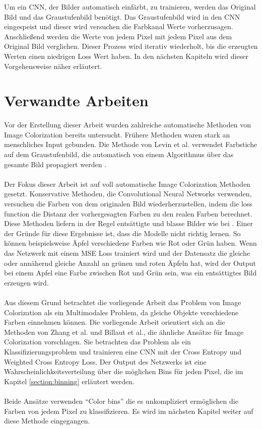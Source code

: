 Um ein CNN, der Bilder automatisch einfärbt, zu trainieren, werden das Original Bild und das Graustufenbild benötigt. Das Graustufenbild wird
in den CNN eingespeist und dieser wird versuchen die Farbkanal Werte vorherzusagen. Anschließend werden die Werte von jedem Pixel mit jedem Pixel
aus dem Original Bild verglichen. Dieser Prozess wird iterativ wiederholt, bis die erzeugten Werten einen niedrigen Loss Wert haben. In den
nächsten Kapiteln wird dieser Vorgehensweise näher erläutert.

\section{Verwandte Arbeiten}\label{subsection:verwandte-arbeiten}
Vor der Erstellung dieser Arbeit wurden zahlreiche automatische Methoden von Image Colorization bereits untersucht. Frühere Methoden waren
stark an menschliches Input
gebunden. Die Methode von Levin et al. verwendet Farbstiche auf dem Graustufenbild, die automatisch von einem Algorithmus über das gesamte 
Bild propagiert werden \cite{10.1145/1015706.1015780}.
\\
\\
Der Fokus dieser Arbeit ist auf voll automatische Image Colorization Methoden gesetzt. Konservative Methoden, die Convolutional Neural Networks 
verwenden, versuchen die Farben von dem originalen Bild wiederherzustellen, indem die \gls{loss function} die Distanz der vorhergesagten
Farben zu den realen Farben berechnet. Diese Methoden liefern in der Regel entsättigte und blasse Bilder wie bei \cite{zbulak2019image}. 
Einer der Gründe für diese Ergebnisse ist, dass die Modelle nicht richtig lernen. So können beispielsweise Äpfel verschiedene Farben 
wie Rot oder Grün haben. Wenn das Netzwerk mit einem MSE Loss trainiert wird und der Datensatz die gleiche oder annähernd gleiche Anzahl an
grünen und roten Äpfeln hat, wird der Output bei einem Apfel eine Farbe zwischen Rot und Grün sein, was ein entsättigtes Bild erzeugen wird.
\\
\\
Aus diesem Grund betrachtet die vorliegende Arbeit das Problem von Image Colorization als ein Multimodales Problem, 
da gleiche Objekte verschiedene Farben einnehmen können.
Die vorliegende Arbeit orientiert sich an die Methoden von Zhang et al. und Billaut et al., die ähnliche Ansätze für Image Colorization vorschlagen.
Sie betrachten das Problem als ein Klassifizierungsproblem und trainieren eine CNN mit der Cross Entropy und Weighted Cross Entropy Loss. 
Der Output des Netzwerks ist eine Wahrscheinlichkeitsverteilung über die möglichen Bins für jeden Pixel, die im Kapitel \ref{section:binning} erläutert werden.
\\
\\
Beide Ansätze verwenden ``Color \gls{bin}s'' die es unkompliziert ermöglichen die Farben von jedem Pixel zu klassifizieren. 
Es wird im nächsten Kapitel weiter auf diese Methode eingegangen.
